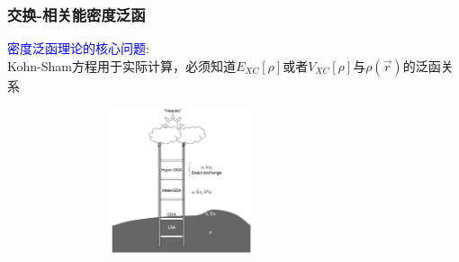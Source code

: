 \frame                               %
{
\frametitle{交换-相关能密度泛函}
\textcolor{blue}{密度泛函理论的核心问题}:\\
\textrm{Kohn-Sham}方程用于实际计算，必须知道$E_{XC}[\rho]$或者$V_{XC}[\rho]$与$\rho(\vec r)$的泛函关系
\vskip 5pt
\begin{minipage}[b]{0.59\textwidth}
 \hspace*{-20pt}
 \vskip -55pt
 \fontsize{7.5pt}{6.0pt}
\end{minipage}
\hfill
\begin{minipage}[b]{0.39\textwidth}
\begin{figure}[h!]
\centering
\hspace*{-15pt}
\includegraphics[height=1.7in,width=3.18in,viewport=10 5 1380 700,clip]{Figures/Jacobi-ladder.png}\\
\label{Jacob's_ladder}
\end{figure}
\vskip -10pt
\end{minipage}
}

